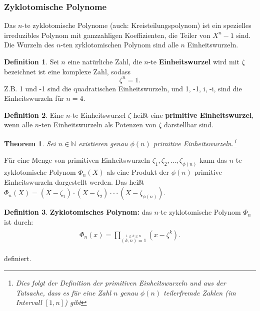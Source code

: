 \documentclass[12pt,oneside]{article}
\newtheorem{theorem}{Theorem}[section]
\theoremstyle{remark}
\theoremstyle{definition}
\newtheorem{definition}{Definition}[section]
\begin{document}
\subsubsection{Zyklotomische Polynome}
Das $n$-te zyklotomische Polynome (auch: Kreisteilungspolynom) ist ein spezielles irreduzibles Polynom mit ganzzahligen Koeffizienten, die Teiler von $X^n - 1$ sind. Die Wurzeln des $n$-ten zyklotomischen Polynom sind alle $n$ Einheitswurzeln. 

\begin{definition}
Sei $n$ eine natürliche Zahl, die $n$-te \textbf{Einheitswurzel} wird mit $\zeta$ bezeichnet ist eine komplexe Zahl, sodass
\begin{equation}
    \zeta^n = 1.
\end{equation}
Z.B. 1 und -1 sind die quadratischen Einheitswurzeln, und 1, -1, i, -i, sind die Einheitswurzeln für $n = 4$.    
\end{definition}

\smallskip

\begin{definition}\label{prim_ein}
Eine $n$-te Einheitswurzel $\zeta$ heißt eine \textbf{primitive Einheitswurzel}, wenn alle $n$-ten Einheitswurzeln als Potenzen von $\zeta$ darstellbar sind. 
\end{definition}

\begin{theorem}
Sei $n \in \mathbb{N}$ existieren genau $\phi(n)$ primitive Einheitswurzeln.\footnote{Dies folgt der Definition der primitiven Einheitswurzeln und aus der Tatsache, dass es für eine Zahl $n$ genau $\phi(n)$ teilerfremde Zahlen (im Intervall $[1,n]$) gibt  } 
\end{theorem}

\smallskip

Für eine Menge von primitiven Einheitswurzeln $\zeta_1, \zeta_2, \dots, \zeta_{\phi(n)}$ kann das  $n$-te zyklotomische Polynom $\Phi_{n}(X)$ als eine Produkt der $\phi(n)$ primitive Einheitswurzeln dargestellt werden. Das heißt $\Phi_{n}(X) = (X - \zeta_1) \cdot (X - \zeta_2) \cdot \cdot \cdot (X - \zeta_{\phi(n)})$. 

\begin{definition}\label{def_cyc_poly}
\textbf{Zyklotomisches Polynom:} das $n$-te zyklotomische Polynom $\Phi_{n}$ ist durch:\newline
\begin{equation}
    \begin{split}
        \begin{aligned}
            \Phi_{n}(x) =  \prod _{\stackrel {1\leq k\leq n}{(k,n)=1}}\left(x- \zeta^k\right).
        \end{aligned}
    \end{split}
\end{equation}

definiert. 
\end{definition}
\end{document}

